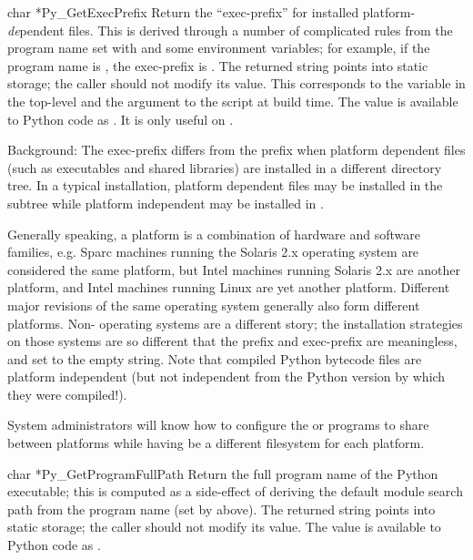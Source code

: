 \documentclass[twoside,openright]{report}
\begin{document}
\begin{cfuncdesc}{char *}{Py_GetExecPrefix}{}
Return the ``exec-prefix'' for installed platform-\emph{de}pendent 
files.  This is derived through a number of complicated rules from the 
program name set with  and some environment 
variables; for example, if the program name is 
, the exec-prefix is 
.  The returned string points into static storage; 
the caller should not modify its value.  This corresponds to the 
 variable in the top-level  and the 
 argument to the  script at build 
time.  The value is available to Python code as 
.  It is only useful on \UNIX{}.

Background: The exec-prefix differs from the prefix when platform 
dependent files (such as executables and shared libraries) are 
installed in a different directory tree.  In a typical installation, 
platform dependent files may be installed in the 
 subtree while platform independent may be 
installed in .

Generally speaking, a platform is a combination of hardware and 
software families, e.g.  Sparc machines running the Solaris 2.x 
operating system are considered the same platform, but Intel machines 
running Solaris 2.x are another platform, and Intel machines running 
Linux are yet another platform.  Different major revisions of the same 
operating system generally also form different platforms.  Non-\UNIX{} 
operating systems are a different story; the installation strategies 
on those systems are so different that the prefix and exec-prefix are 
meaningless, and set to the empty string.  Note that compiled Python 
bytecode files are platform independent (but not independent from the 
Python version by which they were compiled!).

System administrators will know how to configure the  or 
 programs to share  between platforms 
while having  be a different filesystem for each 
platform.
\end{cfuncdesc}

\begin{cfuncdesc}{char *}{Py_GetProgramFullPath}{}
Return the full program name of the Python executable; this is 
computed as a side-effect of deriving the default module search path 
from the program name (set by  above).  The 
returned string points into static storage; the caller should not 
modify its value.  The value is available to Python code as 
.
\end{cfuncdesc}
\end{document}
